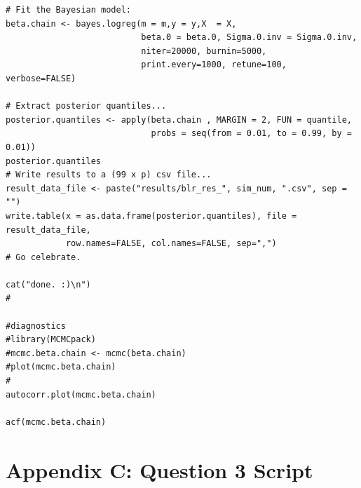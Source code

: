 \documentclass[11pt]{amsart}
\begin{document}
\begin{verbatim}
# Fit the Bayesian model:
beta.chain <- bayes.logreg(m = m,y = y,X  = X,
                           beta.0 = beta.0, Sigma.0.inv = Sigma.0.inv,
                           niter=20000, burnin=5000,
                           print.every=1000, retune=100, verbose=FALSE)

# Extract posterior quantiles...
posterior.quantiles <- apply(beta.chain , MARGIN = 2, FUN = quantile, 
                             probs = seq(from = 0.01, to = 0.99, by = 0.01))
posterior.quantiles
# Write results to a (99 x p) csv file...
result_data_file <- paste("results/blr_res_", sim_num, ".csv", sep = "")
write.table(x = as.data.frame(posterior.quantiles), file = result_data_file, 
            row.names=FALSE, col.names=FALSE, sep=",")
# Go celebrate.

cat("done. :)\n")
#

#diagnostics
#library(MCMCpack)
#mcmc.beta.chain <- mcmc(beta.chain)
#plot(mcmc.beta.chain)
#
autocorr.plot(mcmc.beta.chain)

acf(mcmc.beta.chain)

\end{verbatim}

\newpage
\section*{Appendix C: Question 3 Script}
\end{document}
